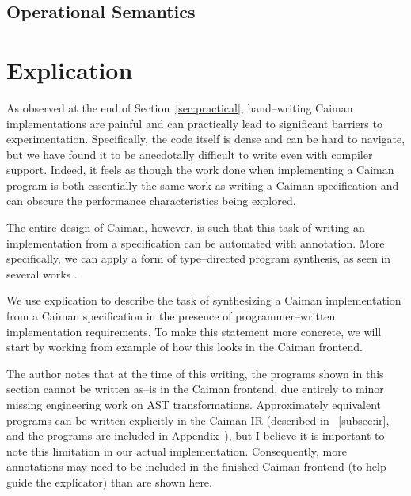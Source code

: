 
\subsection{Operational Semantics}


\section{Explication}
\label{sec:explication}

As observed at the end of Section~\ref{sec:practical}, hand--writing Caiman implementations are painful and can practically lead to significant barriers to experimentation.  Specifically, the code itself is dense and can be hard to navigate, but we have found it to be anecdotally difficult to write even with compiler support.  Indeed, it feels as though the work done when implementing a Caiman program is both essentially the same work as writing a Caiman specification and can obscure the performance characteristics being explored.

The entire design of Caiman, however, is such that this task of writing an implementation from a specification can be automated with annotation.  More specifically, we can apply a form of type--directed program synthesis, as seen in several works .

We use explication to describe the task of synthesizing a Caiman implementation from a Caiman specification in the presence of programmer--written implementation requirements.  To make this statement more concrete, we will start by working from example of how this looks in the Caiman frontend.

The author notes that at the time of this writing, the programs shown in this section cannot be written as--is in the Caiman frontend, due entirely to minor missing engineering work on AST transformations.  Approximately equivalent programs can be written explicitly in the Caiman IR (described in ~\ref{subsec:ir}, and the programs are included in Appendix~), but I believe it is important to note this limitation in our actual implementation.  Consequently, more annotations may need to be included in the finished Caiman frontend (to help guide the explicator) than are shown here.

